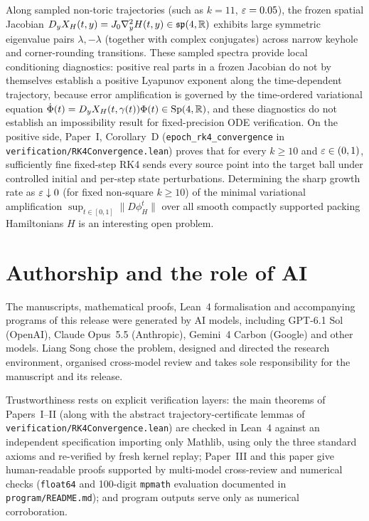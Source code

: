 \begin{remark}\label{rem:saddle-stiffness}
Along sampled non-toric trajectories (such as $k=11$, $\varepsilon=0.05$), the frozen spatial Jacobian
$D_yX_H(t,y)=J_0\nabla_y^2H(t,y)\in\mathfrak{sp}(4,\mathbb{R})$ exhibits large symmetric eigenvalue pairs $\lambda,-\lambda$
(together with complex conjugates) across narrow keyhole and corner-rounding transitions. These sampled spectra provide
local conditioning diagnostics: positive real parts in a frozen Jacobian do not by themselves establish a positive
Lyapunov exponent along the time-dependent trajectory, because error amplification is governed by the time-ordered
variational equation $\dot\Phi(t)=D_yX_H(t,\gamma(t))\Phi(t)\in\mathrm{Sp}(4,\mathbb{R})$, and these diagnostics do not establish
an impossibility result for fixed-precision ODE verification. On the positive side, Paper~I, Corollary~D
(\texttt{epoch\_rk4\_convergence} in \texttt{verification/RK4Convergence.lean}) proves that for every $k\ge10$ and
$\varepsilon\in(0,1)$, sufficiently fine fixed-step RK4 sends every source point into the target ball under controlled initial
and per-step state perturbations. Determining the sharp growth rate as $\varepsilon\downarrow0$ (for fixed non-square $k\ge10$)
of the minimal variational amplification $\sup_{t\in[0,1]}\|D\phi_H^t\|$ over all smooth compactly supported packing
Hamiltonians $H$ is an interesting open problem.
\end{remark}

\section*{Authorship and the role of AI}

The manuscripts, mathematical proofs, Lean~4 formalisation and accompanying programs of this release were generated by
AI models, including GPT-6.1 Sol (OpenAI), Claude Opus~5.5 (Anthropic), Gemini~4 Carbon (Google) and other models.
Liang Song chose the problem, designed and directed the research environment, organised cross-model review and takes
sole responsibility for the manuscript and its release.

Trustworthiness rests on explicit verification layers: the main theorems of Papers~I--II (along with the abstract
trajectory-certificate lemmas of \texttt{verification/RK4Convergence.lean}) are checked in Lean~4 against an
independent specification importing only Mathlib, using only the three standard axioms and re-verified by fresh kernel
replay; Paper~III and this paper give human-readable proofs supported by multi-model cross-review and numerical checks
(\texttt{float64} and 100-digit \texttt{mpmath} evaluation documented in \texttt{program/README.md}); and program
outputs serve only as numerical corroboration.
